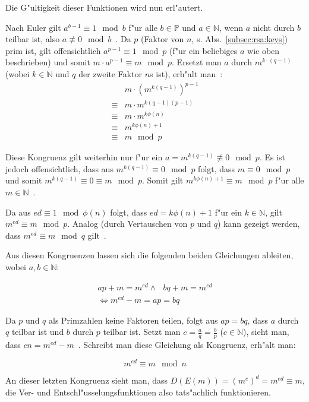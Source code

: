 \documentclass[12pt]{article}
\begin{document}
Die G"ultigkeit dieser Funktionen wird nun erl"autert.

Nach Euler gilt $a^{b-1} \equiv 1 \mod b$ f"ur alle $b \in \mathbb{P}$ und $a \in \mathbb{N}$,
wenn $a$ nicht durch $b$ teilbar ist, also $a \not\equiv 0 \mod b$~\cite{euler41}.
Da $p$ (Faktor von $n$, s. Abs.~\ref{subsec:rsa:keys}) prim ist,
gilt offensichtlich $a^{p-1} \equiv 1 \mod p$
(f"ur ein beliebiges $a$ wie oben beschrieben) und somit $m \cdot a^{p-1} \equiv m \mod p$.
Ersetzt man $a$ durch $m^{k \cdot (q-1)}$
(wobei $k \in \mathbb{N}$ und $q$ der zweite Faktor $n$s ist), erh"alt man~\cite{rsa}:
\[
\begin{aligned}
& m \cdot \left(m^{k(q-1)}\right)^{p-1} \\
\equiv & m \cdot m^{k(q-1)(p-1)} \\
\equiv & m \cdot m^{k\phi(n)} \\
\equiv & m^{k\phi(n) + 1} \\
\equiv & m \mod p
\end{aligned}
\]

Diese Kongruenz gilt weiterhin nur f"ur ein $a = m^{k(q-1)} \not\equiv 0 \mod p$.
Es ist jedoch offensichtlich, dass aus $m^{k(q-1)} \equiv 0 \mod p$ folgt,
dass $m \equiv 0 \mod p$ und somit $m^{k(q-1)} \equiv 0 \equiv m \mod p$.
Somit gilt $m^{k\phi(n)+1} \equiv m \mod p$ f"ur alle $m \in \mathbb{N}$~\cite{rsa}.

Da aus $ed \equiv 1 \mod \phi(n)$ folgt, dass $ed = k\phi(n) +1$ f"ur ein $k \in \mathbb{N}$, gilt $m^{ed} \equiv m \mod p$.
Analog (durch Vertauschen von $p$ und $q$) kann gezeigt werden,
dass $m^{ed} \equiv m \mod q$ gilt~\cite{rsa}.

Aus diesen Kongruenzen lassen sich die folgenden beiden Gleichungen ableiten,
wobei $a, b \in \mathbb{N}$:

\[
\begin{aligned}
ap + m = m^{ed} \land ~~~ bq + m = m^{ed} \\
\iff m^{ed} - m = ap = bq
\end{aligned}
\]

Da $p$ und $q$ als Primzahlen keine Faktoren teilen, folgt aus $ap = bq$,
dass $a$ durch $q$ teilbar ist und $b$ durch $p$ teilbar ist.
Setzt man $c = \frac{a}{q} = \frac{b}{p}$ ($c \in \mathbb{N}$),
sieht man, dass $cn = m^{ed} - m$~\cite{pii1}.
Schreibt man diese Gleichung als Kongruenz, erh"alt man:

\[
m^{ed} \equiv m \mod n
\]

An dieser letzten Kongruenz sieht man, dass $D(E(m)) = (m^e)^d = m^{ed} \equiv m$,
die Ver- und Entschl"usselungsfunktionen also tats"achlich funktionieren.
\end{document}
